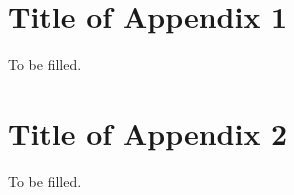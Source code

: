 \chapter{Title of Appendix 1}
\label{app:appendix1}
To be filled.

\chapter{Title of Appendix 2}
\label{app:appendix2}
To be filled.
